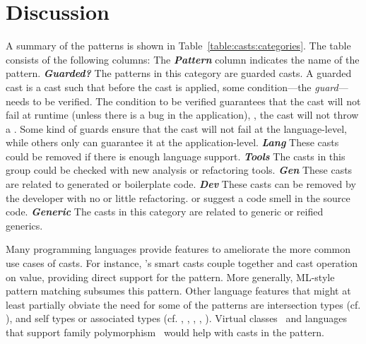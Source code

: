 \section{Discussion}
\label{sec:casts:discussion}

A summary of the patterns is shown in Table~\ref{table:casts:categories}.
The table consists of the following columns:
\newcommand{\gh}[1]{\emph{\textbf{#1}}}
The \gh{Pattern} column indicates the name of the pattern.
\gh{Guarded?} The patterns in this category are guarded casts.
A guarded cast is a cast such that before the cast is applied,
some condition---the \emph{guard}---needs to be verified.
The condition to be verified guarantees that the cast will not fail at runtime (unless there is a bug in the application), \ie,
the cast will not throw a .
Some kind of guards ensure that the cast will not fail at the language-level,
while others only can guarantee it at the application-level.
\gh{Lang} These casts could be removed if there is enough language support.
\gh{Tools} The casts in this group could be checked with new analysis or refactoring tools.
\gh{Gen} These casts are related to generated or boilerplate code.
\gh{Dev} These casts can be removed by the developer with no or little refactoring.
or suggest a code smell in the source code.
\gh{Generic} The casts in this category are related to generic or reified generics.



Many programming languages provide features to ameliorate the more common use cases of casts.
For instance,
\kotlin{}'s smart casts couple together  and cast operation on value, 
providing direct support for the  pattern.
More generally, ML-style pattern matching subsumes this pattern.
Other language features that might at least partially obviate the need for some of the patterns are
intersection types (cf. ),
and
self types or associated types (cf. 
,
,
,
,
).
Virtual classes~\cite{gbeta, scalaIndependentlyExtensible} and languages that support
family polymorphism~\cite{ernstFamilyPolymorphism2001}
would help with casts in the  pattern.

